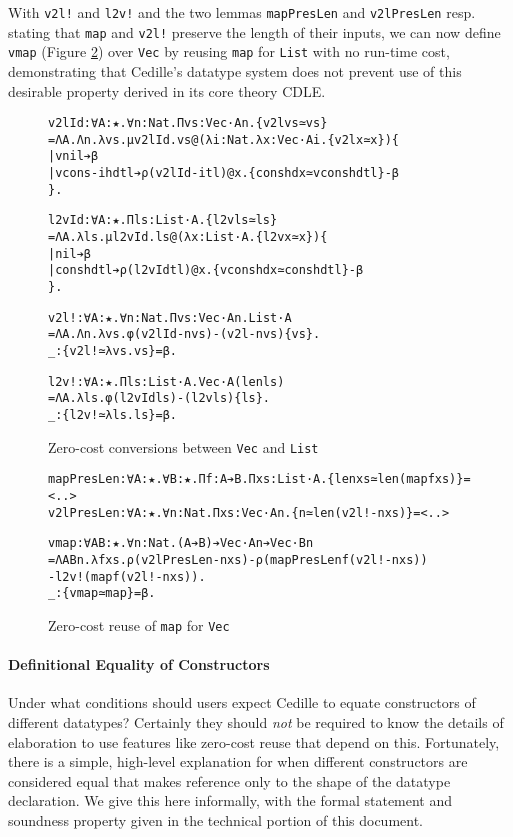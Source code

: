 \documentclass{article}
\begin{document}
With \texttt{v2l!} and \texttt{l2v!} and the two lemmas \texttt{mapPresLen} and
\texttt{v2lPresLen} resp. stating that \texttt{map} and \texttt{v2l!} preserve
the length of their inputs, we can now define \texttt{vmap} (Figure
\ref{fig:cedille-vmap}) over \texttt{Vec} by reusing \texttt{map} for
\texttt{List} with no run-time cost, demonstrating that Cedille's datatype
system does not prevent use of this desirable property derived in its core
theory CDLE.

\begin{figure}[h]
  \small
\begin{alltt}
v2lId: ∀ A: ★. ∀ n: Nat. Π vs: Vec ·A n. \{v2l vs ≃ vs\}
  = Λ A. Λ n. λ vs. μ v2lId. vs @(λ i: Nat. λ x: Vec ·A i. \{v2l x ≃ x\}) \{
  | vnil ➔ β
  | vcons -i hd tl ➔ ρ (v2lId -i tl) @ x. \{cons hd x ≃ vcons hd tl\} - β
  \}.

l2vId: ∀ A: ★. Π ls: List ·A. \{l2v ls ≃ ls\}
  = Λ A. λ ls. μ l2vId. ls @(λ x: List ·A. \{l2v x ≃ x\}) \{
  | nil ➔ β
  | cons hd tl ➔ ρ (l2vId tl) @ x. \{vcons hd x ≃ cons hd tl\} - β
  \}.

v2l!: ∀ A : ★. ∀ n: Nat. Π vs: Vec ·A n. List ·A
  = Λ A. Λ n. λ vs. φ (v2lId -n vs) - (v2l -n vs) \{vs\}.
_ : \{v2l! ≃ λ vs. vs\} = β.

l2v!: ∀ A: ★. Π ls: List ·A. Vec ·A (len ls)
  = Λ A. λ ls. φ (l2vId ls) - (l2v ls) \{ls\}.
_ : \{l2v! ≃ λ ls. ls\} = β.
\end{alltt}
  \caption{Zero-cost conversions between \texttt{Vec} and \texttt{List}}
  \label{fig:cedille-convert-int}
\end{figure}

\begin{figure}[h]
\small
\begin{alltt}
mapPresLen: ∀ A: ★. ∀ B: ★. Π f: A ➔ B. Π xs: List ·A. \{len xs ≃ len (map f xs)\} = <..>
v2lPresLen: ∀ A: ★. ∀ n: Nat. Π xs: Vec ·A n. \{n ≃ len (v2l! -n xs)\} = <..>

vmap: ∀ A B: ★. ∀ n: Nat. (A ➔ B) ➔ Vec ·A n ➔ Vec ·B n
  = Λ A B n. λ f xs. ρ (v2lPresLen -n xs) - ρ (mapPresLen f (v2l! -n xs))
  - l2v! (map f (v2l! -n xs)).
_ : \{vmap ≃ map\} = β.
\end{alltt}
  \caption{Zero-cost reuse of \texttt{map} for \texttt{Vec}}
  \label{fig:cedille-vmap}
\end{figure}

\paragraph{\textbf{Definitional Equality of Constructors}}
Under what conditions should users expect Cedille to equate constructors of
different datatypes? Certainly they should \textit{not} be required to know the
details of elaboration to use features like zero-cost reuse that depend
on this. Fortunately, there is a simple, high-level explanation for when
different constructors are considered equal that makes reference only to the
shape of the datatype declaration. We give this here informally, with
the formal statement and soundness property given in the technical portion of
this document.
\end{document}
